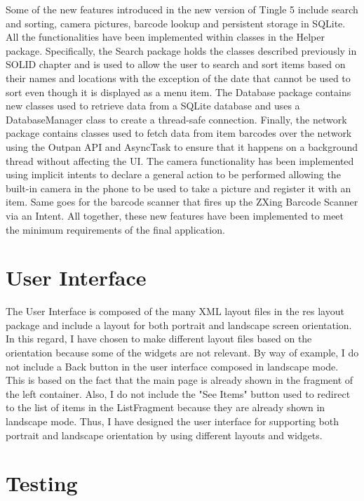 \documentclass{article} %
\begin{document}
Some of the new features introduced in the new version of Tingle 5 include search and sorting, camera pictures, barcode lookup and persistent storage in SQLite. All the functionalities have been implemented within classes in the Helper package. Specifically, the Search package holds the classes described previously in SOLID chapter and is used to allow the user to search and sort items based on their names and locations with the exception of the date that cannot be used to sort even though it is displayed as a menu item. The Database package contains new classes used to retrieve data from a SQLite database and uses a DatabaseManager class to create a thread-safe connection. Finally, the network package contains classes used to fetch data from item barcodes over the network using the Outpan API and AsyncTask to ensure that it happens on a background thread without affecting the UI. The camera functionality has been implemented using implicit intents to declare a general action to be performed allowing the built-in camera in the phone to be used to take a picture and register it with an item. Same goes for the barcode scanner that fires up the ZXing Barcode Scanner via an Intent. All together, these new features have been implemented to meet the minimum requirements of the final application.

\section{User Interface}
 
 
The User Interface is composed of the many XML layout files in the res layout package and include a layout for both portrait and landscape screen orientation. In this regard, I have chosen to make different layout files based on the orientation because some of the widgets are not relevant. By way of example, I do not include a Back button in the user interface composed in landscape mode. This is based on the fact that the main page is already shown in the fragment of the left container. Also, I do not include the "See Items" button used to redirect to the list of items in the ListFragment because they are already shown in landscape mode. Thus, I have designed the user interface for supporting both portrait and landscape orientation by using different layouts and widgets. 

\section{Testing}
\end{document}
